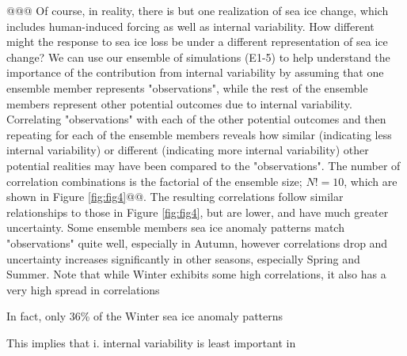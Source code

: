 \documentclass[twocol]{ametsoc}
\begin{document}
@@@
Of course, in reality, there is but one realization of sea ice change, which includes human-induced forcing as well as internal variability. How different might the response to sea ice loss be under a different representation of sea ice change? We can use our ensemble of simulations (E1-5) to help understand the importance of the contribution from internal variability by assuming that one ensemble member represents "observations", while the rest of the ensemble members represent other potential outcomes due to internal variability. Correlating "observations" with each of the other potential outcomes and then repeating for each of the ensemble members reveals how similar (indicating less internal variability) or different (indicating more internal variability) other potential realities may have been compared to the "observations".  The number of correlation combinations is the factorial of the ensemble size; $N! = 10$, which are shown in Figure \ref{fig:fig4}@@. The resulting correlations follow similar relationships to those in Figure \ref{fig:fig4}, but are lower, and have much greater uncertainty. Some ensemble members sea ice anomaly patterns match "observations" quite well, especially in Autumn, however correlations drop and uncertainty increases significantly in other seasons, especially Spring and Summer. Note that while Winter exhibits some high correlations, it also has a very high spread in correlations

In fact, only 36\% of the Winter sea ice anomaly patterns 

This implies that i. internal variability is least important in 
\end{document}
